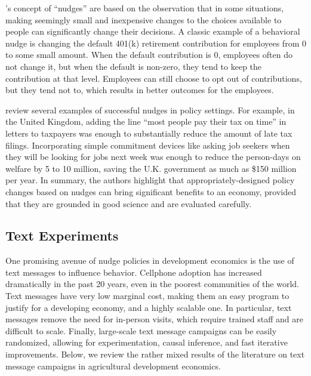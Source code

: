 \documentclass[12pt]{article}
\begin{document}
\textcite{thaler_nudge_2009}'s concept of ``nudges'' are based on the observation that in some situations, making seemingly small and inexpensive changes to the choices available to people can significantly change their decisions. A classic example of a behavioral nudge is changing the default 401(k) retirement contribution for employees from 0 to some small amount. When the default contribution is 0, employees often do not change it, but when the default is non-zero, they tend to keep the contribution at that level. Employees can still choose to opt out of contributions, but they tend not to, which results in better outcomes for the employees.

\textcite{halpern_nudging_2016} review several examples of successful nudges in policy settings. For example, in the United Kingdom, adding the line ``most people pay their tax on time'' in letters to taxpayers was enough to substantially reduce the amount of late tax filings. Incorporating simple commitment devices like asking job seekers when they will be looking for jobs next week was enough to reduce the person-days on welfare by 5 to 10 million, saving the U.K. government as much as \$150 million per year. In summary, the authors highlight that appropriately-designed policy changes based on nudges can bring significant benefits to an economy, provided that they are grounded in good science and are evaluated carefully.

\subsection{Text Experiments}
One promising avenue of nudge policies in development economics is the use of text messages to influence behavior. Cellphone adoption has increased dramatically in the past 20 years, even in the poorest communities of the world. Text messages have very low marginal cost, making them an easy program to justify for a developing economy, and a highly scalable one. In particular, text messages remove the need for in-person visits, which require trained staff and are difficult to scale. Finally, large-scale text message campaigns can be easily randomized, allowing for experimentation, causal inference, and fast iterative improvements. Below, we review the rather mixed results of the literature on text message campaigns in agricultural development economics.
\end{document}
